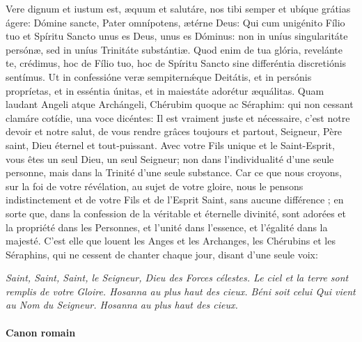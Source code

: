 \documentclass[twoside]{article}
\begin{document}
\begin{paracol}{2}

Vere dignum et iustum est, æquum et salutáre, nos tibi semper et ubíque grátias ágere: Dómine sancte, Pater omnípotens, ætérne Deus: Qui cum unigénito Fílio tuo et Spíritu Sancto unus es Deus, unus es Dóminus: non in uníus singularitáte persónæ, sed in uníus Trinitáte substántiæ. Quod enim de tua glória, revelánte te, crédimus, hoc de Fílio tuo, hoc de Spíritu Sancto sine differéntia discretiónis sentímus. Ut in confessióne veræ sempiternǽque Deitátis, et in persónis propríetas, et in esséntia únitas, et in maiestáte adorétur æquálitas. Quam laudant Angeli atque Archángeli, Chérubim quoque ac Séraphim: qui non cessant clamáre cotídie, una voce dicéntes:
\switchcolumn
Il est vraiment juste et nécessaire, c’est notre devoir et notre salut, de vous rendre grâces toujours et partout, Seigneur, Père saint, Dieu éternel et tout‑puissant. Avec votre Fils unique et le Saint-Esprit, vous êtes un seul Dieu, un seul Seigneur; non dans l’individualité d’une seule personne, mais dans la Trinité d’une seule substance. Car ce que nous croyons, sur la foi de votre révélation, au sujet de votre gloire, nous le pensons indistinctement et de votre Fils et de l’Esprit Saint, sans aucune différence ; en sorte que, dans la confession de la véritable et éternelle divinité, sont adorées et la propriété dans les Personnes, et l’unité dans l’essence, et l’égalité dans la majesté. C’est elle que louent les Anges et les Archanges, les Chérubins et les Séraphins, qui ne cessent de chanter chaque jour, disant d’une seule voix:
\end{paracol}
\emph{Saint, Saint, Saint, le Seigneur, Dieu des Forces célestes. Le ciel et la terre sont remplis de votre Gloire. Hosanna au plus haut des cieux.
Béni soit celui Qui vient au Nom du Seigneur. Hosanna au plus haut des cieux.}
\newpage
\paragraph{Canon romain}
\end{document}
